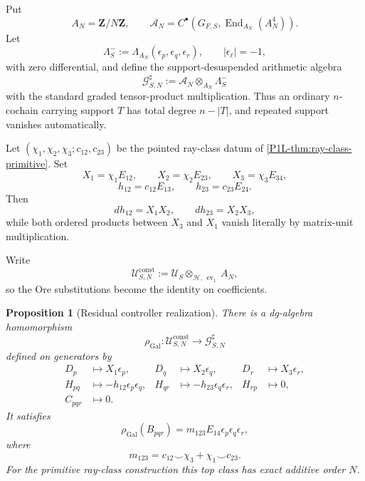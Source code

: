 \documentclass[11pt]{article}
\newtheorem{proposition}[theorem]{Proposition}
\theoremstyle{remark}
\newcommand{\Z}{\mathbf Z}
\providecommand{\End}{\operatorname{End}}
\begin{document}
Put
\[
 A_N=\Z/N\Z,
 \qquad
 \mathscr A_N=C^\bullet\!\left(G_{F,S},\End_{A_N}(A_N^4)\right).
\]
Let
\[
 \Lambda^-_S:=\Lambda_{A_N}(\epsilon_p,\epsilon_q,\epsilon_r),
 \qquad |\epsilon_\ell|=-1,
\]
with zero differential, and define the support-desuspended arithmetic algebra
\[
 \boxed{\mathscr G^{\sharp}_{S,N}:=\mathscr A_N\otimes_{A_N}\Lambda^-_S}
\]
with the standard graded tensor-product multiplication.  Thus an ordinary $n$-cochain carrying support $T$ has total degree $n-|T|$, and repeated support vanishes automatically.

Let $(\chi_1,\chi_2,\chi_3;c_{12},c_{23})$ be the pointed ray-class datum of \cref{P1L-thm:ray-class-primitive}.  Set
\[
 X_1=\chi_1E_{12},\qquad
 X_2=\chi_2E_{23},\qquad
 X_3=\chi_3E_{34},
\]
\[
 h_{12}=c_{12}E_{13},\qquad
 h_{23}=c_{23}E_{24}.
\]
Then
\[
 dh_{12}=X_1X_2,\qquad dh_{23}=X_2X_3,
\]
while both ordered products between $X_3$ and $X_1$ vanish literally by matrix-unit multiplication.

Write
\[
 \mathscr U^{\mathrm{const}}_{S,N}
 :=\mathscr U_S\otimes_{\mathcal H,\,\operatorname{ev}_1}A_N,
\]
so the Ore substitutions become the identity on coefficients.

\begin{proposition}[Residual controller realization]\label{P1L-thm:full-galois-controller}
There is a dg-algebra homomorphism
\[
 \boxed{
 \rho_{\mathrm{Gal}}:
 \mathscr U^{\mathrm{const}}_{S,N}
 \longrightarrow
 \mathscr G^{\sharp}_{S,N}}
\]
defined on generators by
\[
 \begin{aligned}
 D_p&\longmapsto X_1\epsilon_p,
 &D_q&\longmapsto X_2\epsilon_q,
 &D_r&\longmapsto X_3\epsilon_r,\\
 H_{pq}&\longmapsto-h_{12}\epsilon_p\epsilon_q,
 &H_{qr}&\longmapsto-h_{23}\epsilon_q\epsilon_r,
 &H_{rp}&\longmapsto0,\\
 C_{pqr}&\longmapsto0.
 \end{aligned}
\]
It satisfies
\[
 \boxed{
 \rho_{\mathrm{Gal}}(B_{pqr})
 =m_{123}E_{14}\epsilon_p\epsilon_q\epsilon_r,}
\]
where
\[
 m_{123}=c_{12}\smile\chi_3+\chi_1\smile c_{23}.
\]
For the primitive ray-class construction this top class has exact additive order $N$.
\end{proposition}
\end{document}
